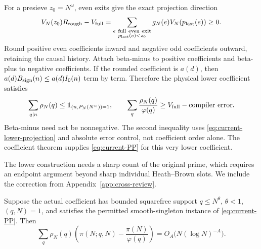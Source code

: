 For a presieve $z_0=N^\omega$, even exits give the exact projection
direction
\begin{equation}
 V_N(z_0)R_{\rm rough}-V_{\rm full}
  =\sum_{\substack{e\ {\rm full\ even\ exit}\\p_{\rm last}(e)<z_0}}
                              g_N(e)V_N(p_{\rm last}(e))\ge0.
 \label{eq:current-lower-projection}
\end{equation}
Round positive even coefficients inward and negative odd coefficients
outward, retaining the causal history.  Attach beta-minus to positive
coefficients and beta-plus to negative coefficients.  If the rounded
coefficient is $a(d)$, then
$a(d)B_{\rm sign}(n)\le a(d)I_0(n)$ term by term.  Therefore the
physical lower coefficient satisfies
\[
 \sum_{q\mid n}\rho_N(q)\le
           {\bf1}_{(n,P_N(N^w))=1},\qquad
 \sum_q\frac{\rho_N(q)}{\varphi(q)}
              \ge V_{\rm full}-\text{compiler error}.
\]
Beta-minus need not be nonnegative.  The second inequality uses
\eqref{eq:current-lower-projection} and absolute error control, not
coefficient order alone.  The coefficient theorem supplies
\eqref{eq:current-PP} for this very lower coefficient.

The lower construction needs a sharp count of the original prime,
which requires an endpoint argument beyond sharp individual
Heath--Brown slots.  We include the correction from
Appendix~\ref{app:cross-review}.

\begin{lemma}
\label{lem:current-sharp-prime}
Suppose the actual coefficient has bounded squarefree support
$q\le N^\theta$, $\theta<1$, $(q,N)=1$, and satisfies the permitted
smooth-singleton instance of \eqref{eq:current-PP}.  Then
\begin{equation}
 \sum_q\rho_N(q)
    \left(\pi(N;q,N)-\frac{\pi(N)}{\varphi(q)}\right)
      =O_A\bigl(N(\log N)^{-A}\bigr).
 \label{eq:current-sharp-pi}
\end{equation}
\end{lemma}

